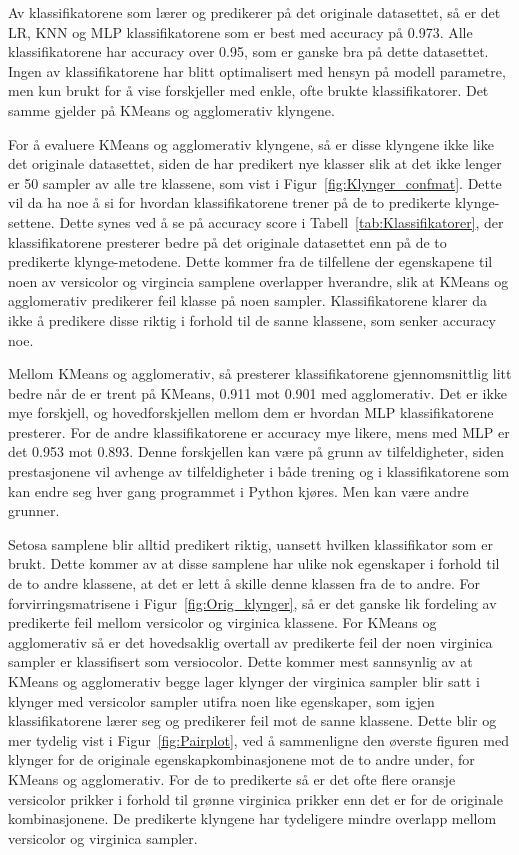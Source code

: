 \documentclass[twocolumn,norwegian]{article}
\begin{document}
	Av klassifikatorene som lærer og predikerer på det originale datasettet, så er det LR, KNN og MLP klassifikatorene som er best med accuracy på 0.973. Alle klassifikatorene har accuracy over 0.95, som er ganske bra på dette datasettet. Ingen av klassifikatorene har blitt optimalisert med hensyn på modell parametre, men kun brukt for å vise forskjeller med enkle, ofte brukte klassifikatorer. Det samme gjelder på KMeans og agglomerativ klyngene.
	
	For å evaluere KMeans og agglomerativ klyngene, så er disse klyngene ikke like det originale datasettet, siden de har predikert nye klasser slik at det ikke lenger er 50 sampler av alle tre klassene, som vist i Figur~\ref{fig:Klynger_confmat}. Dette vil da ha noe å si for hvordan klassifikatorene trener på de to predikerte klynge-settene. Dette synes ved å se på accuracy score i Tabell~\ref{tab:Klassifikatorer}, der klassifikatorene presterer bedre på det originale datasettet enn på de to predikerte klynge-metodene. Dette kommer fra de tilfellene der egenskapene til noen av versicolor og virgincia samplene overlapper hverandre, slik at KMeans og agglomerativ predikerer feil klasse på noen sampler. Klassifikatorene klarer da ikke å predikere disse riktig i forhold til de sanne klassene, som senker accuracy noe. 
	
	Mellom KMeans og agglomerativ, så presterer klassifikatorene gjennomsnittlig litt bedre når de er trent på KMeans, 0.911 mot 0.901 med agglomerativ. Det er ikke mye forskjell, og hovedforskjellen mellom dem er hvordan MLP klassifikatorene presterer. For de andre klassifikatorene er accuracy mye likere, mens med MLP er det 0.953 mot 0.893. Denne forskjellen kan være på grunn av tilfeldigheter, siden prestasjonene vil avhenge av tilfeldigheter i både trening og i klassifikatorene som kan endre seg hver gang programmet i Python kjøres. Men kan være andre grunner.
	
	Setosa samplene blir alltid predikert riktig, uansett hvilken klassifikator som er brukt. Dette kommer av at disse samplene har ulike nok egenskaper i forhold til de to andre klassene, at det er lett å skille denne klassen fra de to andre. For forvirringsmatrisene i Figur~\ref{fig:Orig_klynger}, så er det ganske lik fordeling av predikerte feil mellom versicolor og virginica klassene. For KMeans og agglomerativ så er det hovedsaklig overtall av predikerte feil der noen virginica sampler er klassifisert som versiocolor. Dette kommer mest sannsynlig av at KMeans og agglomerativ begge lager klynger der virginica sampler blir satt i klynger med versicolor sampler utifra noen like egenskaper, som igjen klassifikatorene lærer seg og predikerer feil mot de sanne klassene. Dette blir og mer tydelig vist i Figur~\ref{fig:Pairplot}, ved å sammenligne den øverste figuren med klynger for de originale egenskapkombinasjonene mot de to andre under, for KMeans og agglomerativ. For de to predikerte så er det ofte flere oransje versicolor prikker i forhold til grønne virginica prikker enn det er for de originale kombinasjonene. De predikerte klyngene har tydeligere mindre overlapp mellom versicolor og virginica sampler.
	
\end{document}

